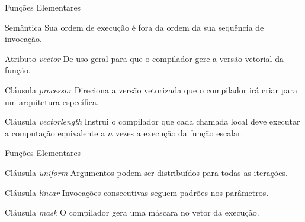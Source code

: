 \documentclass{beamer}
\begin{document}
\begin{frame}{Funções Elementares}
\begin{block}{Semântica}
    Sua ordem de execução é fora da ordem da sua sequência de invocação.
\end{block}
\begin{block}{Atributo \textit{vector}}
    De uso geral para que o compilador gere a versão vetorial da função.
\end{block}
\begin{block}{Cláusula \textit{processor}}
    Direciona a versão vetorizada que o compilador irá criar para um arquitetura específica.
\end{block}
\begin{block}{Cláusula \textit{vectorlength}}
    Instrui o compilador que cada chamada local deve executar a computação equivalente a $n$ vezes  a execução da função escalar.
\end{block}
\end{frame}
\begin{frame}{Funções Elementares}
\begin{block}{Cláusula \textit{uniform}}
    Argumentos podem ser distribuídos para todas as iterações.
\end{block}
\begin{block}{Cláusula \textit{linear}}
    Invocações consecutivas seguem padrões nos parâmetros.
\end{block}
\begin{block}{Cláusula \textit{mask}}
    O compilador gera uma máscara no vetor da execução.
\end{block}
\end{frame}
\end{document}
